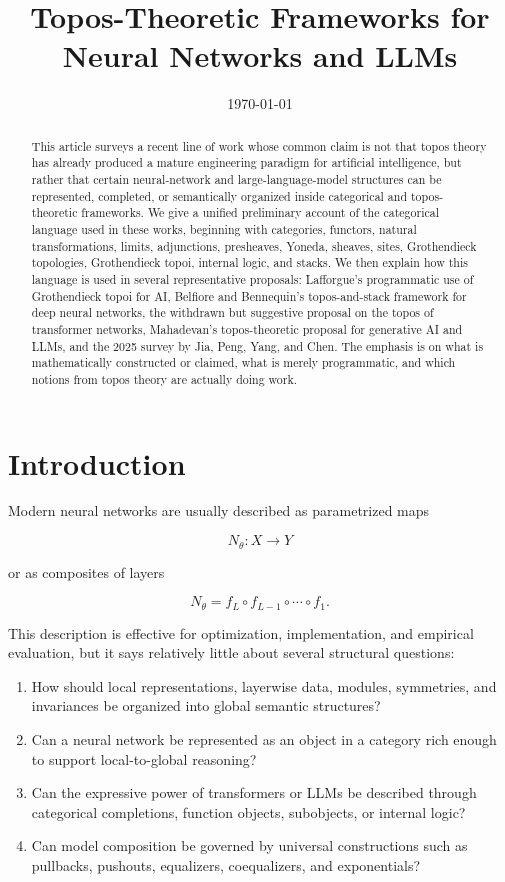 \documentclass[11pt]{article}
\title{Topos-Theoretic Frameworks for Neural Networks and LLMs}
\author{}
\date{\today}
\begin{document}
\maketitle


\begin{abstract}
This article surveys a recent line of work whose common claim is not that topos theory has already produced a mature engineering paradigm for artificial intelligence, but rather that certain neural-network and large-language-model structures can be represented, completed, or semantically organized inside categorical and topos-theoretic frameworks. We give a unified preliminary account of the categorical language used in these works, beginning with categories, functors, natural transformations, limits, adjunctions, presheaves, Yoneda, sheaves, sites, Grothendieck topologies, Grothendieck topoi, internal logic, and stacks. We then explain how this language is used in several representative proposals: Lafforgue's programmatic use of Grothendieck topoi for AI, Belfiore and Bennequin's topos-and-stack framework for deep neural networks, the withdrawn but suggestive proposal on the topos of transformer networks, Mahadevan's topos-theoretic proposal for generative AI and LLMs, and the 2025 survey by Jia, Peng, Yang, and Chen. The emphasis is on what is mathematically constructed or claimed, what is merely programmatic, and which notions from topos theory are actually doing work.


\end{abstract}

\section{Introduction}

Modern neural networks are usually described as parametrized maps


\[
N_\theta:X\longrightarrow Y
\]

or as composites of layers


\[
N_\theta
=f_L\circ f_{L-1}\circ\cdots\circ f_1.
\]

This description is effective for optimization, implementation, and empirical evaluation, but it says relatively little about several structural questions:


\begin{enumerate}
\item How should local representations, layerwise data, modules, symmetries, and
invariances be organized into global semantic structures?

\item Can a neural network be represented as an object in a category rich enough to
support local-to-global reasoning?

\item Can the expressive power of transformers or LLMs be described through
categorical completions, function objects, subobjects, or internal logic?

\item Can model composition be governed by universal constructions such as
pullbacks, pushouts, equalizers, coequalizers, and exponentials?

\end{enumerate}
\end{document}

